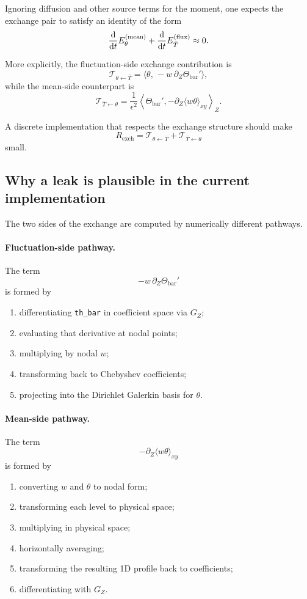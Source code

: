 \documentclass[11pt]{article}
\begin{document}
Ignoring diffusion and other source terms for the moment, one expects the exchange pair to satisfy an identity of the form
\[
\dv{t} E_\theta^{(\mathrm{mean})}
+
\dv{t} E_{\bar T}^{(\mathrm{flux})}
\approx 0.
\]

More explicitly, the fluctuation-side exchange contribution is
\[
\mathcal{T}_{\theta \leftarrow \bar T}
=
\langle \theta,\,-w\,\partial_Z\Theta_{\mathrm{bar}}' \rangle,
\]
while the mean-side counterpart is
\[
\mathcal{T}_{\bar T \leftarrow \theta}
=
\frac{1}{\epsilon^2}
\left\langle
\Theta_{\mathrm{bar}}',
-\partial_Z\langle w\theta\rangle_{xy}
\right\rangle_Z.
\]

A discrete implementation that respects the exchange structure should make
\[
R_{\mathrm{exch}}
=
\mathcal{T}_{\theta \leftarrow \bar T}
+
\mathcal{T}_{\bar T \leftarrow \theta}
\]
small.

\subsection{Why a leak is plausible in the current implementation}

The two sides of the exchange are computed by numerically different pathways.

\paragraph{Fluctuation-side pathway.}
The term
\[
-w\,\partial_Z\Theta_{\mathrm{bar}}'
\]
is formed by

\begin{enumerate}
\item differentiating \texttt{th\_bar} in coefficient space via $G_Z$;
\item evaluating that derivative at nodal points;
\item multiplying by nodal $w$;
\item transforming back to Chebyshev coefficients;
\item projecting into the Dirichlet Galerkin basis for $\theta$.
\end{enumerate}

\paragraph{Mean-side pathway.}
The term
\[
-\partial_Z\langle w\theta\rangle_{xy}
\]
is formed by

\begin{enumerate}
\item converting $w$ and $\theta$ to nodal form;
\item transforming each level to physical space;
\item multiplying in physical space;
\item horizontally averaging;
\item transforming the resulting 1D profile back to coefficients;
\item differentiating with $G_Z$.
\end{enumerate}
\end{document}
